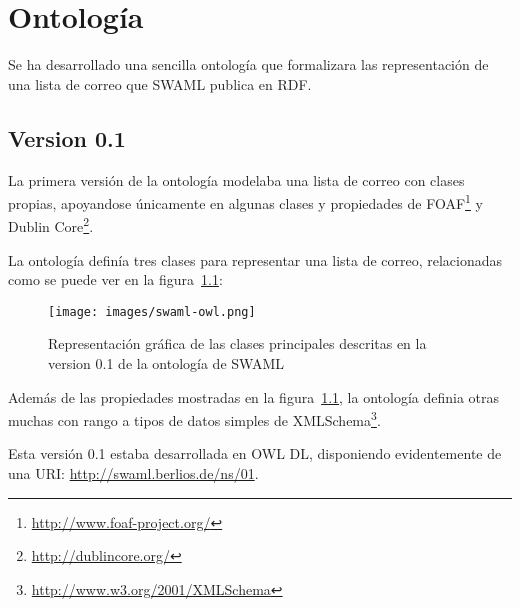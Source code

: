 
\chapter{Ontología}

Se ha desarrollado una sencilla ontología que formalizara las representación de 
una lista de correo que SWAML publica en RDF. 

\section{Version 0.1}

La primera versión de la ontología modelaba una lista de correo con clases propias,
apoyandose únicamente en algunas clases y propiedades de 
FOAF\footnote{\url{http://www.foaf-project.org/}} y 
Dublin Core\footnote{\url{http://dublincore.org/}}.

La ontología definía tres clases para representar una lista de correo, relacionadas
como se puede ver en la figura~\ref{fig:swamlOWL}:

\begin{figure}[ht]
	\centering
	\texttt{[image: images/swaml-owl.png]}
	\caption{Representación gráfica de las clases principales descritas en la version 0.1 de la ontología de SWAML}
	\label{fig:swamlOWL}
\end{figure}

Además de las propiedades mostradas en la figura~\ref{fig:swamlOWL}, la ontología
definia otras muchas con rango a tipos de datos simples de
XMLSchema\footnote{\url{http://www.w3.org/2001/XMLSchema}}.

Esta versión 0.1 estaba desarrollada en OWL DL, disponiendo evidentemente
de una URI: \url{http://swaml.berlios.de/ns/01}.

\newpage

